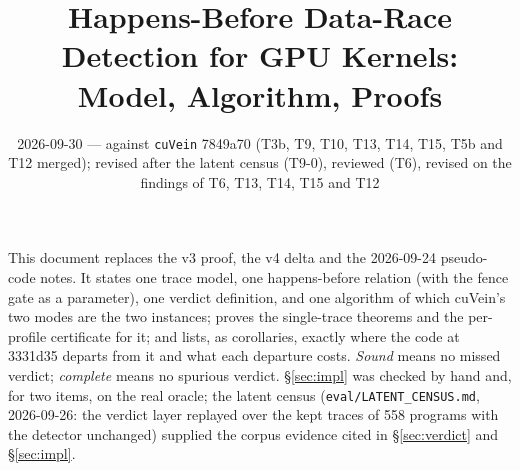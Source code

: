 \documentclass[11pt]{article}
\title{Happens-Before Data-Race Detection for GPU Kernels:\\ Model, Algorithm, Proofs}
\date{2026-09-30 --- against \texttt{cuVein} 7849a70 (T3b, T9, T10, T13, T14, T15, T5b and T12 merged); revised after the latent census (T9-0), reviewed (T6), revised on the findings of T6, T13, T14, T15 and T12}
\theoremstyle{remark}
\begin{document}
\maketitle

\noindent This document replaces the v3 proof, the v4 delta and the 2026-09-24 pseudo-code
notes. It states one trace model, one happens-before relation (with the fence gate as a
parameter), one verdict definition, and one algorithm of which cuVein's two modes are the
two instances; proves the single-trace theorems and the per-profile certificate for it;
and lists, as corollaries, exactly where the code at 3331d35 departs from it and what
each departure costs. \emph{Sound} means no missed verdict; \emph{complete} means no
spurious verdict. \S\ref{sec:impl} was checked by hand and, for two items, on the real
oracle; the latent census (\texttt{eval/LATENT\_CENSUS.md}, 2026-09-26: the verdict layer
replayed over the kept traces of 558 programs with the detector unchanged) supplied the
corpus evidence cited in \S\ref{sec:verdict} and \S\ref{sec:impl}.
\end{document}
